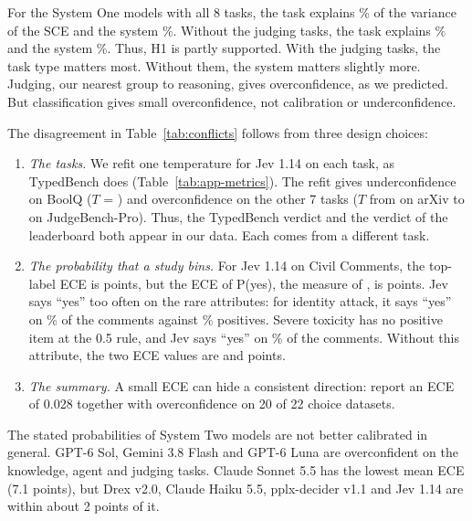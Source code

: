 \documentclass[11pt]{article}
\begin{document}
For the \nFullSystems{} System One models with all 8 tasks, the task explains \varTaskE\% of the variance of the SCE and the system \varSystemE\%. Without the judging tasks, the task explains \varTaskNoJudge\% and the system \varSystemNoJudge\%. Thus, H1 is partly supported. With the judging tasks, the task type matters most. Without them, the system matters slightly more. Judging, our nearest group to reasoning, gives overconfidence, as we predicted. But classification gives small overconfidence, not calibration or underconfidence.

The disagreement in Table~\ref{tab:conflicts} follows from three design choices:
\begin{enumerate}
\setlength\itemsep{1pt}
\item \emph{The tasks.} We refit one temperature for Jev 1.14 on each task, as TypedBench does (Table~\ref{tab:app-metrics}). The refit gives underconfidence on BoolQ ($T$ = \jevTempBoolq) and overconfidence on the other 7 tasks ($T$ from \jevTempArxiv{} on arXiv to \jevTempJudgebench{} on JudgeBench-Pro). Thus, the TypedBench verdict and the verdict of the leaderboard both appear in our data. Each comes from a different task.
\item \emph{The probability that a study bins.} For Jev 1.14 on Civil Comments, the top-label ECE is \jevEceCivil{} points, but the ECE of P(yes), the measure of \citet{deusser2026evaluating}, is \jevCwEceCivil{} points. Jev says ``yes'' too often on the rare attributes: for identity attack, it says ``yes'' on \jevYesIdentityAttack\% of the comments against \posIdentityAttack\% positives. Severe toxicity has no positive item at the 0.5 rule, and Jev says ``yes'' on \jevYesSevereToxicity\% of the comments. Without this attribute, the two ECE values are \jevCivilEceWo{} and \jevCivilCwEceWo{} points.
\item \emph{The summary.} A small ECE can hide a consistent direction: \citet{deusser2026evaluating} report an ECE of 0.028 together with overconfidence on 20 of 22 choice datasets.
\end{enumerate}

The stated probabilities of System Two models are not better calibrated in general. GPT-6 Sol, Gemini 3.8 Flash and GPT-6 Luna are overconfident on the knowledge, agent and judging tasks. Claude Sonnet 5.5 has the lowest mean ECE (7.1 points), but Drex v2.0, Claude Haiku 5.5, pplx-decider v1.1 and Jev 1.14 are within about 2 points of it.


\end{document}
